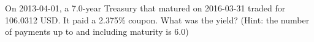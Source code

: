 On 2013-04-01, a 7.0-year Treasury that matured on 2016-03-31 traded for 106.0312 USD. It paid a 2.375\% coupon. What was the yield? (Hint: the number of payments up to and including maturity is 6.0)
